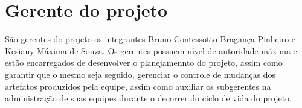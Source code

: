 \section{Gerente do projeto}

São gerentes do projeto os integrantes Bruno Contessotto Bragança
Pinheiro e Kesiany Máxima de Souza. Os gerentes possuem nível de autoridade
máxima e estão encarregados de desenvolver o planejamennto do projeto, assim
como garantir que o mesmo seja seguido, gerenciar o controle de mudanças dos artefatos
produzidos pela equipe, assim como auxiliar os subgerentes na administração
de suas equipes durante o decorrer do ciclo de vida do projeto.
